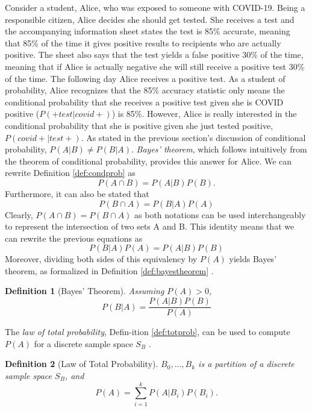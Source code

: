 \documentclass[
  12pt,
  twoside]{book}
\theoremstyle{definition}
\newtheorem{definition}{Definition}[chapter]
\theoremstyle{definition}
\theoremstyle{definition}
\theoremstyle{remark}
\begin{document}
Consider a student, Alice, who was exposed to someone with COVID-19.
Being a responsible citizen, Alice decides she should get tested.
She receives a test and the accompanying information sheet states the test is 85\% accurate, meaning that 85\% of the time it gives positive results to recipients who are actually positive. The sheet also says that the test yields a false positive 30\% of the time, meaning that if Alice is actually negative she will still receive a positive test 30\% of the time.
The following day Alice receives a positive test.
As a student of probability, Alice recognizes that the 85\% accuracy statistic only means the conditional probability that she receives a positive test given she is COVID positive (\(P(+ test|covid+)\)) is 85\%.
However, Alice is really interested in the conditional probability that she is positive given she just tested positive, \(P(covid+|test+)\).
As stated in the previous section's discussion of conditional probability, \(P(A|B) \neq P(B|A)\).
\emph{Bayes' theorem}, which follows intuitively from the theorem of conditional probability, provides this answer for Alice.
We can rewrite Definition \ref{def:condprob} as
\[P(A \cap B)=P(A|B)P(B).\]
Furthermore, it can also be stated that
\[P(B \cap A)=P(B|A)P(A)\]
Clearly, \(P(A \cap B)=P(B \cap A)\) as both notations can be used interchangeably to represent the intersection of two sets A and B.
This identity means that we can rewrite the previous equations as
\[P(B|A)P(A)=P(A|B)P(B)\]
Moreover, dividing both sides of this equivalency by \(P(A)\) yields Bayes' theorem, as formalized in Definition \ref{def:bayestheorem} \citep{Junker2003}.

\begin{definition}[Bayes' Theorem]
\protect\hypertarget{def:bayestheorem}{}{\label{def:bayestheorem} {} }\emph{Assuming \(P(A)>0\),}
\[P(B|A)=\frac{P(A|B)P(B)}{P(A)}\]
\end{definition}

The \emph{law of total probability}, Defin-ition \ref{def:totprob}, can be used to compute \(P(A)\) for a discrete sample space \(S_{B}\) \citep[  1.7]{Wasserman2004}.

\begin{definition}[Law of Total Probability]
\protect\hypertarget{def:totprob}{}{\label{def:totprob} {} }\emph{\(B_{0},...,B_{k}\) is a partition of a discrete sample space \(S_{B}\), and}
\[P(A)=\sum_{i=1}^{k}P(A|B_{i})P(B_{i}).\]
\end{definition}
\end{document}
